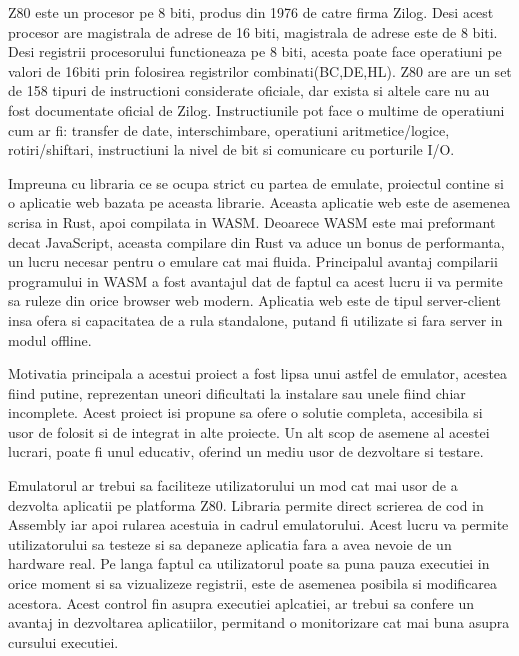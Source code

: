 \documentclass[titlepage,12pt]{article}
\begin{document}
    \ac {Z80} este un procesor pe 8 biti, produs din 1976 de catre firma Zilog. Desi acest procesor are magistrala de adrese de 16 biti, magistrala de adrese este de 8 biti.
    Desi registrii procesorului functioneaza pe 8 biti, acesta poate face operatiuni pe valori de 16biti prin folosirea registrilor combinati(BC,DE,HL).
    Z80 are are un set de 158 tipuri de instructioni considerate oficiale, dar exista si altele care nu au fost documentate oficial de Zilog. Instructiunile pot face o multime de operatiuni cum ar fi: transfer de date, interschimbare, operatiuni aritmetice/logice, rotiri/shiftari, instructiuni la nivel de bit si comunicare cu porturile I/O.

    Impreuna cu libraria ce se ocupa strict cu partea de emulate, proiectul contine si o aplicatie web bazata pe aceasta librarie.
    Aceasta aplicatie web este de asemenea scrisa in Rust, apoi compilata in \ac {WASM}. Deoarece \ac {WASM} este mai preformant decat JavaScript, aceasta compilare din Rust va aduce un bonus de performanta, un lucru necesar pentru o emulare cat mai fluida.
    Principalul avantaj compilarii programului in \ac {WASM} a fost avantajul dat de faptul ca acest lucru ii va permite sa ruleze din orice browser web modern.
    Aplicatia web este de tipul server-client insa ofera si capacitatea de a rula standalone, putand fi utilizate si fara server in modul offline.

    Motivatia principala a acestui proiect a fost lipsa unui astfel de emulator, acestea fiind putine, reprezentan uneori dificultati la instalare sau unele fiind chiar incomplete.
    Acest proiect isi propune sa ofere o solutie completa, accesibila si usor de folosit si de integrat in alte proiecte. Un alt scop de asemene al acestei lucrari, poate fi unul educativ, oferind un mediu usor de dezvoltare si testare.

    Emulatorul ar trebui sa faciliteze utilizatorului un mod cat mai usor de a dezvolta aplicatii pe platforma Z80.
    Libraria permite direct scrierea de cod in Assembly iar apoi rularea acestuia in cadrul emulatorului. Acest lucru va permite utilizatorului sa testeze si sa depaneze aplicatia fara a avea nevoie de un hardware real.
    Pe langa faptul ca utilizatorul poate sa puna pauza executiei in orice moment si sa vizualizeze registrii, este de asemenea posibila si modificarea acestora.
    Acest control fin asupra executiei aplcatiei, ar trebui sa confere un avantaj in dezvoltarea aplicatiilor, permitand o monitorizare cat mai buna asupra cursului executiei.
\end{document}
